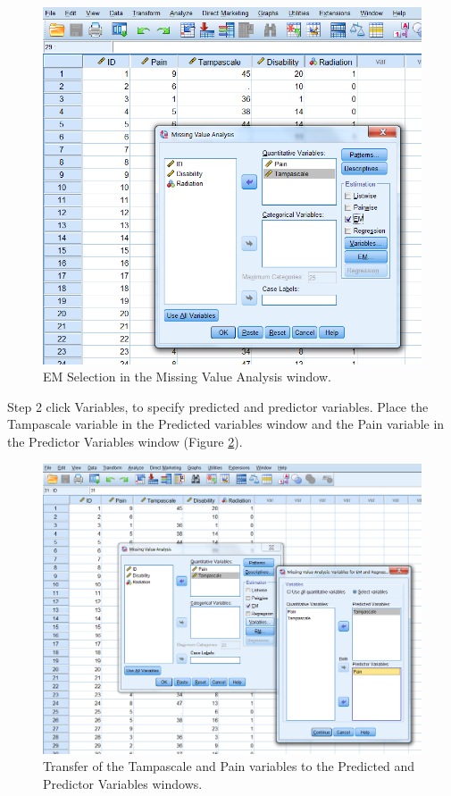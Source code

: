 \documentclass[]{book}
\begin{document}
\begin{figure}

{\centering \includegraphics[width=0.7\linewidth]{images/fig3.10} 

}

\caption{EM Selection in the Missing Value Analysis window.}\label{fig:fig3-10}
\end{figure}

Step 2 click Variables, to specify predicted and predictor variables.
Place the Tampascale variable in the Predicted variables window and the
Pain variable in the Predictor Variables window (Figure
\ref{fig:fig3-11}).

\begin{figure}

{\centering \includegraphics[width=0.7\linewidth]{images/fig3.11} 

}

\caption{Transfer of the Tampascale and Pain variables to the Predicted and Predictor Variables windows.}\label{fig:fig3-11}
\end{figure}
\end{document}
